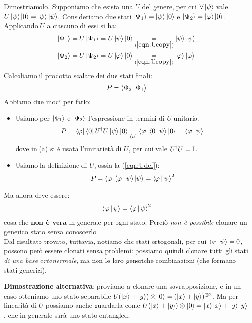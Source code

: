 \documentclass[../../InformazioneQuantistica.tex]{subfiles}
\begin{document}
Dimostriamolo. Supponiamo che esista una $U$ del genere, per cui $\forall \Ket{\psi}$ vale $U\Ket{\psi}\Ket{0} = \Ket{\psi}\Ket{\psi}$. Consideriamo due stati $\Ket{\Psi_1}=\Ket{\psi}\Ket{0}$ e $\Ket{\Psi_2}=\Ket{\varphi}\Ket{0}$. Applicando $U$ a ciascuno di essi si ha:
\begin{align}
\Ket{\Phi_1} &= U\Ket{\Psi_1}=
U\Ket{\psi}\Ket{0} \underset{(\ref{eqn:Ucopy})}{=} \Ket{\psi}\Ket{\psi} \nonumber\\
\Ket{\Phi_2} &= U\Ket{\Psi_2} =
U\Ket{\varphi}\Ket{0}  \underset{(\ref{eqn:Ucopy})}{=} \Ket{\varphi}\Ket{\varphi}
\label{eqn:Udef}
\end{align}
Calcoliamo il prodotto scalare dei due stati finali:
\begin{align*}
P = \Braket{\Phi_2|\Phi_1}
\end{align*}
Abbiamo due modi per farlo:
\begin{itemize}
\item Usiamo per $\Ket{\Phi_1}$ e $\Ket{\Phi_2}$ l'espressione in termini di $U$ unitario.
\begin{align*}
P = \Bra{\varphi}\Bra{0}U^\dag U \Ket{\psi}\Ket{0} \underset{(a)}{=} \Bra{\varphi}\Braket{0|\psi}\Ket{0} = \Braket{\varphi|\psi}
\end{align*}
dove in (a) si è usata l'unitarietà di $U$, per cui vale $U^\dag U = \mathbb{I}$.

\item Usiamo la definizione di $U$, ossia la (\ref{eqn:Udef}):
\begin{align*}
P = \Bra{\varphi}\Braket{\varphi|\psi}\Ket{\psi} = \Braket{\varphi|\psi}^2
\end{align*}
\end{itemize}
Ma allora deve essere:
\begin{align*}
\Braket{\varphi|\psi} = \Braket{\varphi|\psi}^2
\end{align*}
cosa che \textbf{non è vera} in generale per ogni stato. Perciò \textit{non è possibile} clonare un generico stato senza conoscerlo.\\
Dal risultato trovato, tuttavia, notiamo che stati ortogonali, per cui $\Braket{\varphi|\psi}=0$, possono però essere clonati senza problemi: possiamo quindi clonare tutti gli stati \textit{di una base ortonormale}, ma non le loro generiche combinazioni (che formano stati generici).

\begin{appr}
    \textbf{Dimostrazione alternativa}: proviamo a clonare una sovrapposizione, e in un caso otteniamo uno stato separabile \(U (\Ket{x} + \Ket{y}) \otimes \Ket{0} = (\Ket{x} + \Ket{y}) ^{\otimes 2} \). Ma per linearità di $U$ possiamo anche guardarla come \(U (\Ket{x} + \Ket{y}) \otimes \Ket{0} = \Ket{x} \Ket{x} + \Ket{y} \Ket{y} \), che in generale sarà uno stato entangled.
\end{appr}
\end{document}

